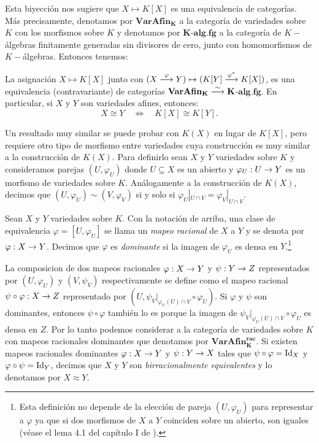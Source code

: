 \documentclass[../../tesis_maestria]{subfiles}
\begin{document}
Esta biyección nos sugiere que $X\mapsto K[X]$ es una equivalencia de categorías. Más precisamente, denotamos por $\mathbf{VarAfin_K}$ a la categoría de variedades sobre $K$ con los morfismos sobre $K$ y denotamos por $\mathbf{K}$-$\mathbf{alg.fg}$ a la categoría de $K-$álgebras finitamente generadas sin divisores de cero, junto con homomorfismos de $K-$álgebras. Entonces tenemos:

\begin{thm}\label{thm:equiv-afin-k-alg}
	La asignación $X\mapsto K[X]$ junto con $(X\overset{\varphi}{\longrightarrow}Y)\mapsto(K[Y]\overset{\varphi^*}{\longrightarrow}K[X])$, es una equivalencia (contravariante) de categorías $\mathbf{VarAfin_K} \overset{\sim}{\longrightarrow}\mathbf{K}$-$\mathbf{alg.fg}$. En particular, si $X$ y $Y$ son variedades afines, entonces:
	\[
		X\cong Y\quad\iff\quad K[X]\cong K[Y].
	\]
\end{thm}

Un resultado muy similar se puede probar con $K(X)$ en lugar de $K[X]$, pero requiere otro tipo de morfismo entre variedades cuya construcción es muy similar a la construcción de $K(X)$. Para definirlo sean $X$ y $Y$ variedades sobre $K$ y consideramos parejas $(U,\varphi_U)$ donde $U\subseteq X$ es un abierto y $\varphi_U:U\rightarrow Y$ es un morfismo de variedades sobre $K$. Análogamente a la construcción de $K(X)$, decimos que $(U,\varphi_U)\sim(V,\varphi_V)$ si y solo si $\varphi_U|_{U\cap V}=\varphi_V|_{U\cap V}$.

\begin{defin}
Sean $X$ y $Y$ variedades sobre $K$. Con la notación de arriba, una clase de equivalencia $\varphi=[U,\varphi_U]$ se llama un \emph{mapeo racional} de $X$ a $Y$ y se denota por $\varphi:X\rightarrow Y$. Decimos que $\varphi$ es \emph{dominante} si la imagen de $\varphi_U$ es densa en $Y$.\footnote{Esta definición no depende de la elección de pareja $(U,\varphi_U)$ para representar a $\varphi$ ya que si dos morfismos de $X$ a $Y$ coinciden sobre un abierto, son iguales (véase el lema 4.1 del capítulo I de \cite{HartshorneAG}).}
\end{defin}

\begin{nota}
La composicion de dos mapeos racionales $\varphi:X\rightarrow Y$ y $\psi:Y\rightarrow Z$ representados por $(U,\varphi_U)$ y $(V,\psi_V)$ respectivamente se define como el mapeo racional $\psi\circ \varphi: X\rightarrow Z$ representado por $(U,\psi_V|_{\varphi_U(U)\cap V}\circ\varphi_U)$. Si $\varphi$ y $\psi$ son dominantes, entonces $\psi\circ \varphi$ también lo es porque la imagen de $\psi_V|_{\varphi_U(U)\cap V}\circ\varphi_U$ es densa en $Z$. Por lo tanto podemos considerar a la categoría de variedades sobre $K$ con mapeos racionales dominantes que denotamos por $\mathbf{VarAfin_K^{rac}}$. Si existen mapeos racionales dominantes $\varphi:X\rightarrow Y$ y $\psi:Y\rightarrow X$ tales que $\psi\circ\varphi=\mathrm{Id}_X$ y $\varphi\circ\psi=\mathrm{Id}_Y$, decimos que $X$ y $Y$ son \emph{birracionalmente equivalentes} y lo denotamos por $X \approx Y$.
\end{nota}
\end{document}
